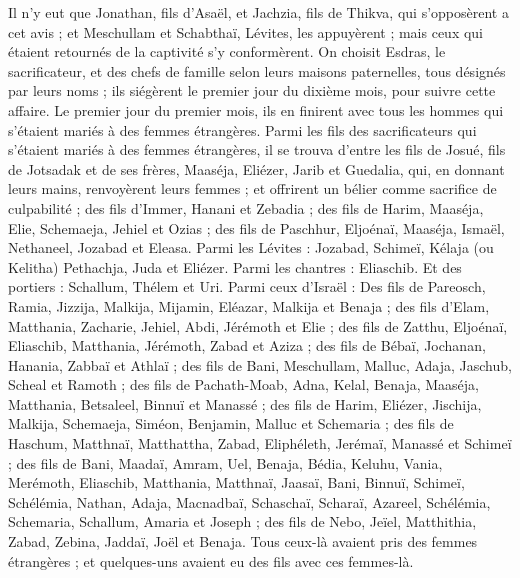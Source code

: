 \begin{multicols}{2}
Il n'y eut que Jonathan, fils d'Asaël, et Jachzia, fils de Thikva, qui s'opposèrent a cet avis ; et Meschullam et Schabthaï, Lévites, les appuyèrent ;
mais ceux qui étaient retournés de la captivité s’y conformèrent. On choisit Esdras, le sacrificateur, et des chefs de famille selon leurs maisons paternelles, tous désignés par leurs noms ; ils siégèrent le premier jour du dixième mois, pour suivre cette affaire.
Le premier jour du premier mois, ils en finirent avec tous les hommes qui s’étaient mariés à des femmes étrangères.
Parmi les fils des sacrificateurs qui s’étaient mariés à des femmes étrangères, il se trouva d'entre les fils de Josué, fils de Jotsadak et de ses frères, Maaséja, Eliézer, Jarib et Guedalia,
qui, en donnant leurs mains, renvoyèrent leurs femmes ; et offrirent un bélier comme sacrifice de culpabilité ;
des fils d'Immer, Hanani et Zebadia ;
des fils de Harim, Maaséja, Elie, Schemaeja, Jehiel et Ozias ;
des fils de Paschhur, Eljoénaï, Maaséja, Ismaël, Nethaneel, Jozabad et Eleasa.
Parmi les Lévites : Jozabad, Schimeï, Kélaja (ou Kelitha) Pethachja, Juda et Eliézer.
Parmi les chantres : Eliaschib. Et des portiers : Schallum, Thélem et Uri.
Parmi ceux d'Israël : Des fils de Pareosch, Ramia, Jizzija, Malkija, Mijamin, Eléazar, Malkija et Benaja ;
des fils d’Elam, Matthania, Zacharie, Jehiel, Abdi, Jérémoth et Elie ;
des fils de Zatthu, Eljoénaï, Eliaschib, Matthania, Jérémoth, Zabad et Aziza ;
des fils de Bébaï, Jochanan, Hanania, Zabbaï et Athlaï ;
des fils de Bani, Meschullam, Malluc, Adaja, Jaschub, Scheal et Ramoth ;
des fils de Pachath-Moab, Adna, Kelal, Benaja, Maaséja, Matthania, Betsaleel, Binnuï et Manassé ;
des fils de Harim, Eliézer, Jischija, Malkija, Schemaeja, Siméon,
Benjamin, Malluc et Schemaria ;
des fils de Haschum, Matthnaï, Matthattha, Zabad, Eliphéleth, Jerémaï, Manassé et Schimeï ;
des fils de Bani, Maadaï, Amram, Uel,
Benaja, Bédia, Keluhu,
Vania, Merémoth, Eliaschib,
Matthania, Matthnaï, Jaasaï,
Bani, Binnuï, Schimeï,
Schélémia, Nathan, Adaja,
Macnadbaï, Schaschaï, Scharaï,
Azareel, Schélémia, Schemaria,
Schallum, Amaria et Joseph ;
des fils de Nebo, Jeïel, Matthithia, Zabad, Zebina, Jaddaï, Joël et Benaja.
Tous ceux-là avaient pris des femmes étrangères ; et  quelques-uns avaient eu des fils avec ces femmes-là.
\PPE{}
\end{multicols}

